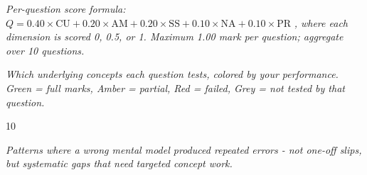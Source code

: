\documentclass[11pt,a4paper]{article}
\begin{document}
\par\vspace{0.3cm}
{\fontsize{9pt}{12pt}\selectfont\color{tsGrey}\textit{Per-question score formula: }}%
{\fontsize{10pt}{12pt}\selectfont $Q = 0.40 \times \mathrm{CU} + 0.20 \times \mathrm{AM} + 0.20 \times \mathrm{SS} + 0.10 \times \mathrm{NA} + 0.10 \times \mathrm{PR}$}%
{\fontsize{9pt}{12pt}\selectfont\color{tsGrey}\textit{, where each dimension is scored 0, 0.5, or 1. Maximum 1.00 mark per question; aggregate over 10 questions.}}

\newpage
{}

\par {\fontsize{9pt}{12pt}\selectfont\color{tsGrey}\textit{Which underlying concepts each question tests, colored by your performance. Green = full marks, Amber = partial, Red = failed, Grey = not tested by that question.}}

\begin{tsConceptMap}{10}
\end{tsConceptMap}


\par {\fontsize{9pt}{12pt}\selectfont\color{tsGrey}\textit{Patterns where a wrong mental model produced repeated errors - not one-off slips, but systematic gaps that need targeted concept work.}}
\end{document}
